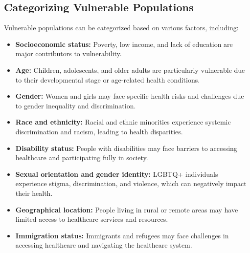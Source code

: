 \documentclass[12pt,a4paper]{article}
\begin{document}
\subsection*{Categorizing Vulnerable Populations}
Vulnerable populations can be categorized based on various factors, including:
\begin{itemize}
    \item \textbf{Socioeconomic status:} Poverty, low income, and lack of education are major contributors to vulnerability.
    \item \textbf{Age:} Children, adolescents, and older adults are particularly vulnerable due to their developmental stage or age-related health conditions.
    \item \textbf{Gender:} Women and girls may face specific health risks and challenges due to gender inequality and discrimination.
    \item \textbf{Race and ethnicity:} Racial and ethnic minorities experience systemic discrimination and racism, leading to health disparities.
    \item \textbf{Disability status:} People with disabilities may face barriers to accessing healthcare and participating fully in society.
    \item \textbf{Sexual orientation and gender identity:} LGBTQ+ individuals experience stigma, discrimination, and violence, which can negatively impact their health.
    \item \textbf{Geographical location:} People living in rural or remote areas may have limited access to healthcare services and resources.
    \item \textbf{Immigration status:} Immigrants and refugees may face challenges in accessing healthcare and navigating the healthcare system.
\end{itemize}
\end{document}
